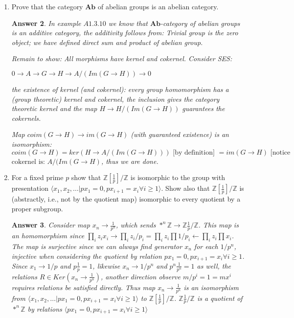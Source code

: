 \documentclass[11pt,leqno]{article}
\newcommand{\Z}{{\mathbb Z}}
\newcommand{\<}[1]{{\langle}#1 {\rangle}}
\theoremstyle{plain}
\newtheorem*{answer*}{Answer}
\theoremstyle{definition}
\theoremstyle{remark}
\numberwithin{equation}{section}
\begin{document}
\begin{enumerate}
\begin{answer*}
    Second assertion follows since any abelian group is a quotient of a free abelian group but the latter is identified as projective abelian group.
    \end{answer*}
    I saw an interesting proof using adjoint functor $Hom_{Mod}(-,-)$


\item Prove that the category $\mathbf{Ab}$ of abelian groups is an abelian category.
    \begin{answer*}
    In example $A1.3.10$ we know that $\mathbf{Ab}$-category of abelian groups is an additive category, the additivity follows from: Trivial group is the zero object; we have defined direct sum and product of abelian group. 
    
    Remain to show: All morphisms have kernel and cokernel. Consider SES: 
    \begin{center} $0 \longrightarrow A \longrightarrow G \longrightarrow H \longrightarrow A/(Im(G\rightarrow H)) \longrightarrow 0$\\ 
    \end{center}
    the existence of kernel (and cokernel): every group homomorphism has a (group theoretic) kernel and cokernel, the inclusion gives the category theoretic kernel and the map $H \rightarrow H/(Im(G\rightarrow H))$ guarantees the cokernels.
    
    Map $coim(G\rightarrow H)\rightarrow im(G\rightarrow H)$ (with guaranteed existence) is an isomorphism: $coim(G\rightarrow H)=ker(H \longrightarrow A/(Im(G\rightarrow H)))\textrm{ [by definition] }=im(G\rightarrow H) \textrm{ [notice }$ $\textrm{cokernel is: } A/(Im(G\rightarrow H)$, thus we are done.
    
    \end{answer*}


\item For a fixed prime $p$ show that $\Z[\frac{1}{p}]/\Z$ is isomorphic to the group with presentation $\langle x_1,x_2,\ldots | px_1= 0, px_{i+1} = x_i \forall i \geq 1 \rangle$.  Show also that $\Z[\frac{1}{p}]/\Z$ is (abstractly, i.e., not by the quotient map) isomorphic to every quotient by a proper subgroup.
    \begin{answer*}
    Consider map $x_n \rightarrow \frac{1}{p^n}$, which sends $*^n\Z \rightarrow \Z\frac{1}{p}/\Z$. This map is an homomorphism since $\prod_i z_ix_i \rightarrow \prod_i {z_i/p_i} = \prod_i z_i \prod {1/p_i} \leftarrow \prod_i z_i \prod x_i$. The map is surjective since we can always find generator $x_n$ for each $1/p^n$, injective when considering the quotient by relation $px_1= 0, px_{i+1} = x_i \forall i \geq 1$. Since $x_1 \rightarrow 1/p$ and $p\frac{1}{p}=1$, likewise $x_n \rightarrow 1/p^n$ and $p^n\frac{1}{p^n}=1$ as well, the relations $R\in Ker(x_n \rightarrow \frac{1}{p^n})$, another direction observe $m/p^i=1=mx^i$ requires relations be satisfied directly. Thus map $x_n \rightarrow \frac{1}{p^n}$ is an isomorphism from $\langle x_1,x_2,\ldots | px_1= 0, px_{i+1} = x_i \forall i \geq 1 \rangle$ to $\Z[\frac{1}{p}]/\Z$.    $\Z\frac{1}{p}/\Z$ is a quotient of $*^n\Z$ by relations $\langle px_1= 0, px_{i+1} = x_i \forall i \geq 1 \rangle $
    

\end{answer*}
\end{enumerate}
\end{document}
